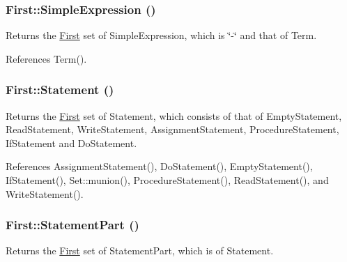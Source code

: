 \hypertarget{classFirst_a414ede2339bc646cd2d6472d8f887376}{
\subsubsection[{SimpleExpression}]{ First::SimpleExpression ()}}
\label{classFirst_a414ede2339bc646cd2d6472d8f887376}


Returns the \hyperlink{classFirst}{First} set of SimpleExpression, which is \char`\"{}-\/\char`\"{} and that of Term. 



References Term().

\hypertarget{classFirst_aa8bb2c9262692d87abdfdf83d740e3c9}{
\subsubsection[{Statement}]{ First::Statement ()}}
\label{classFirst_aa8bb2c9262692d87abdfdf83d740e3c9}


Returns the \hyperlink{classFirst}{First} set of Statement, which consists of that of EmptyStatement, ReadStatement, WriteStatement, AssignmentStatement, ProcedureStatement, IfStatement and DoStatement. 



References AssignmentStatement(), DoStatement(), EmptyStatement(), IfStatement(), Set::munion(), ProcedureStatement(), ReadStatement(), and WriteStatement().

\hypertarget{classFirst_a80a59db3d4fe3e008df01d475a96f354}{
\subsubsection[{StatementPart}]{ First::StatementPart ()}}
\label{classFirst_a80a59db3d4fe3e008df01d475a96f354}


Returns the \hyperlink{classFirst}{First} set of StatementPart, which is of Statement. 



